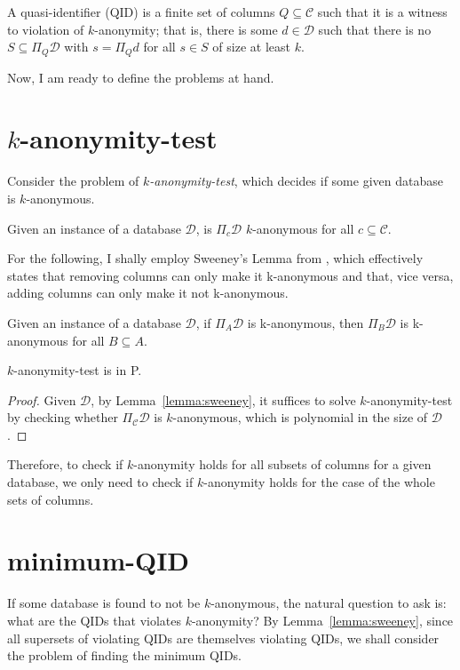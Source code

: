 \documentclass[12pt]{llncs}
\newcommand{\cC}{\mathcal{C}}
\newcommand{\cD}{\mathcal{D}}
\newcommand{\Proj}[1]{\Pi_{#1}}
\begin{document}
\begin{definition}
A quasi-identifier (QID) is a finite set of columns $Q \subseteq \cC$ such that it is a witness to violation of $k$-anonymity; that is, there is some $d \in \cD$ such that there is no $S \subseteq \Proj{Q} \cD$ with $s = \Proj{Q} d$ for all $s \in S$ of size at least $k$.
\end{definition}

Now, I am ready to define the problems at hand.

\section{$k$-anonymity-test}
Consider the problem of \emph{$k$-anonymity-test}, which decides if some given database is $k$-anonymous.

\begin{problem}
Given an instance of a database $\cD$, is $\Proj{c} \cD$ $k$-anonymous for all $c \subseteq \cC$.
\end{problem}

For the following, I shally employ Sweeney's Lemma from \cite{Sweeney:2002}, which effectively states that removing columns can only make it k-anonymous and that, vice versa, adding columns can only make it not k-anonymous.

\begin{lemma}
Given an instance of a database $\cD$, if $\Proj{A} \cD$ is k-anonymous, then $\Proj{B} \cD$ is k-anonymous for all $B \subseteq A$.
\label{lemma:sweeney}
\end{lemma}

\begin{proposition}
$k$-anonymity-test is in P.
\end{proposition}

\begin{proof}
Given $\cD$, by Lemma~\ref{lemma:sweeney}, it suffices to solve $k$-anonymity-test by checking whether $\Proj{\cC} \cD$ is $k$-anonymous, which is polynomial in the size of $\cD$.
\end{proof}

Therefore, to check if $k$-anonymity holds for all subsets of columns for a given database, we only need to check if $k$-anonymity holds for the case of the whole sets of columns.

\section{minimum-QID}
If some database is found to not be $k$-anonymous, the natural question to ask is: what are the QIDs that violates $k$-anonymity? By Lemma~\ref{lemma:sweeney}, since all supersets of violating QIDs are themselves violating QIDs, we shall consider the problem of finding the minimum QIDs.
\end{document}

